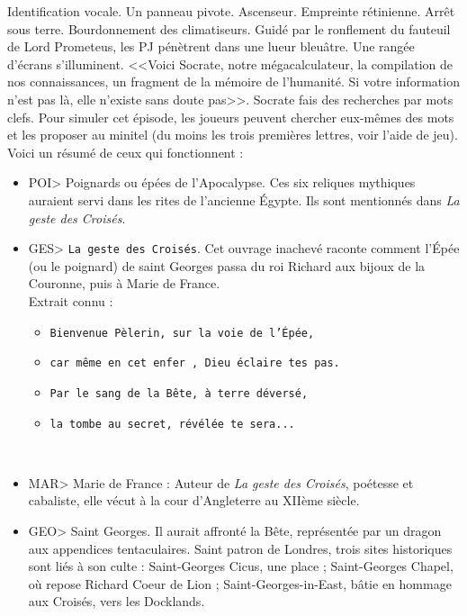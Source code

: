 \documentclass[11pt,twoside,a4paper]{book}
\begin{document}
Identification vocale. Un panneau pivote. Ascenseur. Empreinte r{\'e}tinienne. Arr{\^e}t sous terre. Bourdonnement des climatiseurs. Guid{\'e} par le ronflement du fauteuil de Lord Prometeus, les PJ p{\'e}n{\`e}trent dans une lueur bleu{\^a}tre. Une rang{\'e}e d'{\'e}crans s'illuminent. <<Voici Socrate, notre m{\'e}gacalculateur, la compilation de nos connaissances, un fragment de la m{\'e}moire de l'humanit{\'e}. Si votre information n'est pas l{\`a}, elle n'existe sans doute pas>>. Socrate fais des recherches par mots clefs. Pour simuler cet {\'e}pisode, les joueurs peuvent chercher eux-m{\^e}mes des mots et les proposer au minitel (du moins les trois premi{\`e}res lettres, voir l'aide de jeu). Voici un r{\'e}sum{\'e} de ceux qui fonctionnent :
\setlength\parindent{20pt}
\begin{itemize}
	\item POI> Poignards ou {\'e}p{\'e}es de l'Apocalypse. Ces six reliques mythiques auraient servi dans les rites de l'ancienne {\'E}gypte. Ils sont mentionn{\'e}s dans \emph{La geste des Crois{\'e}s}.
	\item GES> \texttt{La geste des Crois{\'e}s}. Cet ouvrage inachev{\'e} raconte comment l'{\'E}p{\'e}e (ou le poignard) de saint Georges passa du roi Richard aux bijoux de la Couronne, puis {\`a} Marie de France.~\\
		Extrait connu :~\\
		\begin{itemize}
			\item[] \texttt{Bienvenue P{\`e}lerin, sur la voie de l'{\'E}p{\'e}e, }
			\item[] \texttt{car m{\^e}me en cet enfer , Dieu {\'e}claire tes pas. }
			\item[] \texttt{Par le sang de la B{\^e}te, {\`a} terre d{\'e}vers{\'e}, }
			\item[] \texttt{la tombe au secret, r{\'e}v{\'e}l{\'e}e te sera... }
		\end{itemize}~\\
	\item MAR> Marie de France : Auteur de \emph{La geste des Crois{\'e}s}, po{\'e}tesse et cabaliste, elle v{\'e}cut {\`a} la cour d'Angleterre au XII{\`e}me si{\`e}cle.
	\item GEO> Saint Georges. Il aurait affront{\'e} la B{\^e}te, repr{\'e}sent{\'e}e par un dragon aux appendices tentaculaires. Saint patron de Londres, trois sites historiques sont li{\'e}s {\`a} son culte : Saint-Georges Cicus, une place ; Saint-Georges Chapel, o{\`u} repose Richard Coeur de Lion ; Saint-Georges-in-East, b{\^a}tie en hommage aux Crois{\'e}s, vers les Docklands.
\end{itemize}%
\setlength\parindent{0pt}
\end{document}
